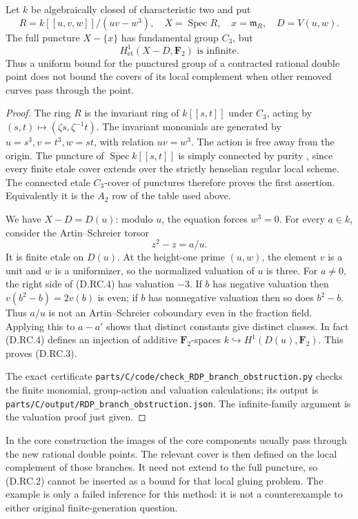 \begin{example}
\label{D:RDP-branch-gluing-obstruction}
Let \(k\) be algebraically closed of characteristic two and put
\[
 R=k[[u,v,w]]/(uv-w^3),\quad
 X=\operatorname{Spec}R,\quad x=\mathfrak m_R,\quad
 D=V(u,w).
\]
The full puncture \(X-\{x\}\) has fundamental group \(C_3\),
but
\[
               H^1_{\mathrm{et}}(X-D,\mathbf F_2)
                        \text{ is infinite}.             \tag{D.RC.3}
\]
Thus a uniform bound for the punctured group of a contracted
rational double point does not bound the covers of its local
complement when other removed curves pass through the point.
\end{example}
\begin{proof}
The ring \(R\) is the invariant ring of \(k[[s,t]]\) under
\(C_3\), acting by \((s,t)\mapsto(\zeta s,\zeta^{-1}t)\).
The invariant monomials are generated by
\(u=s^3,v=t^3,w=st\), with relation \(uv=w^3\).
The action is free away from the origin.  The puncture of
\(\operatorname{Spec}k[[s,t]]\) is simply connected by purity
\citep[Lemma~58.21.3(1), tag~0BMA]{StacksDLocalPurity}, since
every finite etale cover extends over the strictly henselian
regular local scheme.  The connected etale \(C_3\)-cover of
punctures therefore proves the first assertion.  Equivalently it
is the \(A_2\) row of the table used above.

We have \(X-D=D(u)\): modulo \(u\), the equation forces
\(w^3=0\).  For every \(a\in k\), consider the Artin--Schreier
torsor
\[
                   z^2-z=a/u.                           \tag{D.RC.4}
\]
It is finite etale on \(D(u)\).  At the height-one prime
\((u,w)\), the element \(v\) is a unit and \(w\) is a
uniformizer, so the normalized valuation of \(u\) is three.
For \(a\ne0\), the right side of (D.RC.4) has valuation \(-3\).
If \(b\) has negative valuation then
\(v(b^2-b)=2v(b)\) is even; if \(b\) has nonnegative valuation
then so does \(b^2-b\).  Thus \(a/u\) is not an
Artin--Schreier coboundary even in the fraction field.  Applying
this to \(a-a'\) shows that distinct constants give distinct
classes.  In fact (D.RC.4) defines an injection of additive
\(\mathbf F_2\)-spaces \(k\hookrightarrow H^1(D(u),\mathbf F_2)\).
This proves (D.RC.3).

The exact certificate
\nolinkurl{parts/C/code/check_RDP_branch_obstruction.py}
checks the finite monomial, group-action and valuation calculations;
its output is
\nolinkurl{parts/C/output/RDP_branch_obstruction.json}.
The infinite-family argument is the valuation proof just given.
\end{proof}

\begin{remark}
In the core construction the images of the core components usually
pass through the new rational double points.  The relevant cover is
then defined on the local complement of those branches.  It need
not extend to the full puncture, so (D.RC.2) cannot be inserted as a
bound for that local gluing problem.  The example is only a failed
inference for this method: it is not a counterexample to either
original finite-generation question.
\end{remark}
